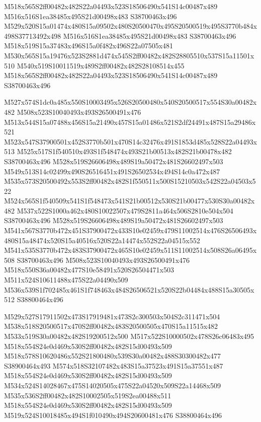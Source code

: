 \documentclass{article}
\begin{document}
\begin{multicols}{2}
M518x565S2ff00482x482S22a04493x523S18506490x541S14c00487x489 M516x516S1ea38485x495S21d00498x483 S38700463x496 M529x520S15a01474x480S15a09502x480S20500470x495S20500519x495S3770b484x498S37713492x498 M516x516S1ea38485x495S21d00498x483 S38700463x496 M518x519S15a37483x496S15a0f482x496S22a07505x481 M530x565S15a19476x523S2881d474x545S2ff00482x482S28805510x537S15a11501x510 M540x519S10011519x489S2ff00482x482S28108514x455 M518x565S2ff00482x482S22a04493x523S18506490x541S14c00487x489 S38700463x496

M527x574S1dc0a485x550S10003495x526S20500480x540S20500517x554S30a00482x482 M508x523S10040493x493S26500491x476 M513x544S15a07488x456S15a21490x457S15a01486x521S2df24491x487S15a29486x521 M523x547S37900501x452S3770b501x470S14c32476x491S1853d485x528S22a04493x513 M525x517S1f540510x493S1f548474x493S21b00513x482S21b00478x482 S38700463x496 M528x519S26606498x489S19a50472x481S26602497x503 M549x513S14c02499x490S26516451x491S26502534x494S14c0a472x487 M535x573S20500492x553S2ff00482x482S1f550511x500S15210503x542S22a04503x522 M524x565S1f540509x541S1f548473x541S21b00512x530S21b00477x530S30a00482x482 M537x522S1000a462x480S10022507x479S2811a464x506S2810e504x504 S38700463x496 M528x519S26606498x489S19a50472x481S26602497x503 M541x567S3770b472x451S37900472x433S10e02459x479S11002514x476S26506493x480S15a48474x520S15a40516x520S22a14474x552S22a04515x552 M541x535S3770b472x483S37900472x465S10e02459x511S11002514x508S26a06495x508 S38700463x496 M508x523S10040493x493S26500491x476 M518x550S36a00482x477S10e58491x520S26504471x503 M511x524S10611488x475S22a04490x509 M536x539S1f702485x461S1f748463x484S26506521x520S22b04484x488S15a30505x512 S38800464x496

M529x527S17911502x473S17919481x473S2c300503x504S2c311471x504 M538x518S20500517x470S2ff00482x483S20500505x470S15a11515x482 M533x519S30a00482x482S19200512x500 M517x522S10000502x478S26c06483x495 M518x554S24e0d469x530S2ff00482x482S15d00493x509 M518x578S10620486x552S21800480x539S30a00482x488S30300482x477 S38900464x493 M574x518S32107482x483S15a37523x491S15a37551x487 M518x554S24e0d469x530S2ff00482x482S15d00493x509 M534x524S14028467x475S14020505x475S22a04520x509S22a14468x509 M535x536S2ff00482x482S10002505x519S2ea00488x511 M518x554S24e0d469x530S2ff00482x482S15d00493x509 M519x524S10018485x494S1f010490x494S20600481x476 S38800464x496


\end{multicols}
\end{document}
